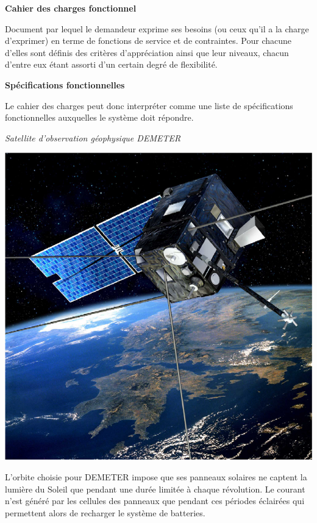 \documentclass[11pt,oneside]{article}
\begin{document}
\begin{defi}
\textbf{Cahier des charges fonctionnel} \cite{norme}

Document par lequel le demandeur exprime ses besoins (ou ceux qu'il a la charge d'exprimer) en terme de fonctions de service et de contraintes. Pour chacune d'elles sont définis des critères d'appréciation ainsi que leur niveaux, chacun d'entre eux étant assorti d'un certain degré de flexibilité.  

\textbf{Spécifications fonctionnelles}

Le cahier des charges peut donc interpréter comme une liste de spécifications fonctionnelles auxquelles le système doit répondre.

\end{defi}

\begin{exemple}
\textit{Satellite d'observation géophysique DEMETER}



\noindent\begin{minipage}[c]{.25\linewidth}
\begin{center}
\includegraphics[width=.9\textwidth]{png/demeter}
\end{center}
\end{minipage}\hfill
\begin{minipage}[c]{.7\linewidth}
L’orbite choisie pour DEMETER impose que ses panneaux solaires ne captent la lumière du Soleil que
pendant une durée limitée à chaque révolution. Le courant n’est généré par les cellules des panneaux que
pendant ces périodes éclairées qui permettent alors de recharger le système de batteries. 
\end{minipage}


\end{exemple}
\end{document}
